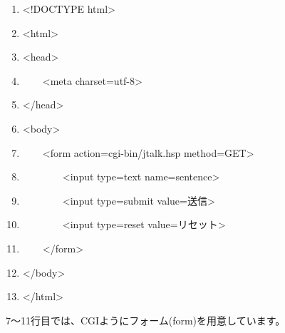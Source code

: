 \documentclass[a4paper,12pt,dvipdfmx]{jarticle}
\begin{document}
\centering
\begin{boxedminipage}{16.148cm}
	\begin{enumerate}
	\baselineskip 10pt
	\setlength{\itemsep}{0cm}
	\item{\textless}!DOCTYPE html{\textgreater}

	\item{\textless}html{\textgreater}

	\item{\textless}head{\textgreater}

	\item\ \ \ \ {\textless}meta
	charset={\textquotedbl}utf-8{\textquotedbl}{\textgreater}

	\item{\textless}/head{\textgreater}

	\item{\textless}body{\textgreater}

	\item\ \ \ \ {\textless}form action={\textquotedbl}cgi-bin/jtalk.hsp{\textquotedbl}
	method={\textquotedbl}GET{\textquotedbl}{\textgreater}

	\item\ \ \ \ \ \ \ \ {\textless}input type={\textquotedbl}text{\textquotedbl}
	name={\textquotedbl}sentence{\textquotedbl}{\textgreater}

	\item\ \ \ \ \ \ \ \ {\textless}input type={\textquotedbl}submit{\textquotedbl}
	value={\textquotedbl}送信{\textquotedbl}{\textgreater}

	\item\ \ \ \ \ \ \ \ {\textless}input type={\textquotedbl}reset{\textquotedbl}
	value={\textquotedbl}リセット{\textquotedbl}{\textgreater}

	\item\ \ \ \ {\textless}/form{\textgreater}

	\item{\textless}/body{\textgreater}

	\item{\textless}/html{\textgreater}
	\end{enumerate}
\end{boxedminipage}
\flushleft
\bigskip


\bigskip


\bigskip



\bigskip

7〜11行目では、CGIようにフォーム(form)を用意しています。
\end{document}
